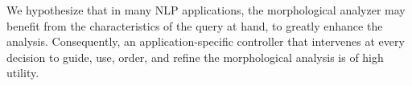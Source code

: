 \documentclass[11pt]{article}
\begin{document}
%
%
We hypothesize that in many NLP applications, the morphological analyzer may
benefit from the characteristics of the query at hand, 
to greatly enhance the analysis.
Consequently, %
an application-specific %
controller that intervenes at every decision to guide, use, order, and 
refine the morphological analysis is of high utility.
\end{document}
